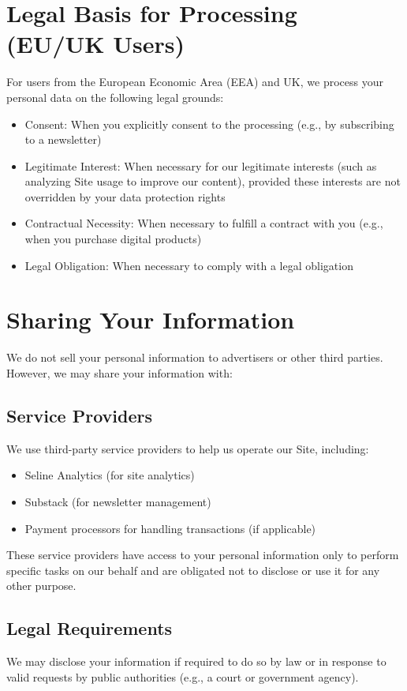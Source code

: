\documentclass[11pt]{article}
\begin{document}
\section{Legal Basis for Processing (EU/UK Users)}

For users from the European Economic Area (EEA) and UK, we process your personal data on the following legal grounds:
\begin{itemize}
  \item Consent: When you explicitly consent to the processing (e.g., by subscribing to a newsletter)
  \item Legitimate Interest: When necessary for our legitimate interests (such as analyzing Site usage to improve our content), provided these interests are not overridden by your data protection rights
  \item Contractual Necessity: When necessary to fulfill a contract with you (e.g., when you purchase digital products)
  \item Legal Obligation: When necessary to comply with a legal obligation
\end{itemize}

\section{Sharing Your Information}

We do not sell your personal information to advertisers or other third parties. However, we may share your information with:

\subsection{Service Providers}
We use third-party service providers to help us operate our Site, including:
\begin{itemize}
  \item Seline Analytics (for site analytics)
  \item Substack (for newsletter management)
  \item Payment processors for handling transactions (if applicable)
\end{itemize}

These service providers have access to your personal information only to perform specific tasks on our behalf and are obligated not to disclose or use it for any other purpose.

\subsection{Legal Requirements}
We may disclose your information if required to do so by law or in response to valid requests by public authorities (e.g., a court or government agency).
\end{document}
